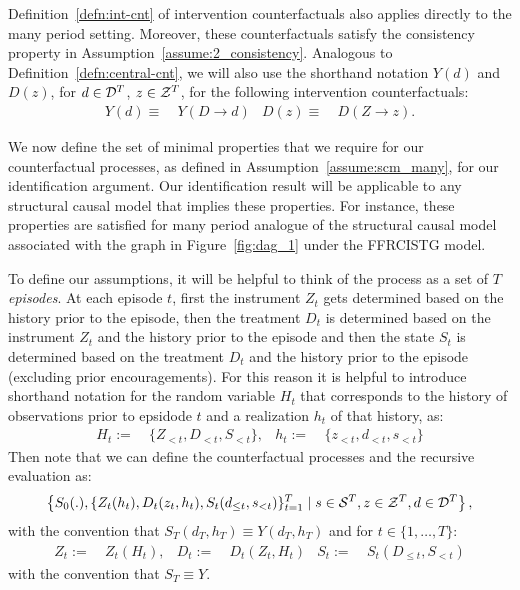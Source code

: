 Definition~\ref{defn:int-cnt} of intervention counterfactuals also applies directly to the many period setting. Moreover, these counterfactuals satisfy the consistency property in Assumption~\ref{assume:2_consistency}.
Analogous to Definition~\ref{defn:central-cnt}, we will also use the shorthand notation $Y(d)$ and $D(z)$, for $d\in {\cal D}^T$, $z\in {\cal Z}^T$, for the following intervention counterfactuals:
\begin{align}
Y(d)\equiv~& Y(D\to d) & 
D(z)\equiv~& D(Z\to z).
\end{align}

We now define the set of minimal properties that we require for our counterfactual processes, as defined in Assumption~\ref{assume:scm_many}, for our identification argument. Our identification result will be applicable to any structural causal model that implies these properties. For instance, these properties are satisfied for many period analogue of the structural causal model associated with the graph in Figure~\ref{fig:dag_1} under the FFRCISTG model. 

To define our assumptions, it will be helpful to think of the process as a set of $T$ \emph{episodes}. At each episode $t$, first the instrument $Z_t$ gets determined based on the history prior to the episode, then the treatment $D_t$ is determined based on the instrument $Z_t$ and the history prior to the episode and then the state $S_t$ is determined based on the treatment $D_t$ and the history prior to the episode (excluding prior encouragements). For this reason it is helpful to introduce shorthand notation for the random variable $H_t$ that corresponds to the history of observations prior to epsidode $t$ and a realization $h_t$ of that history, as:
\begin{align}
    H_t :=~& \{Z_{<t}, D_{<t}, S_{<t}\}, & h_t :=~& \{z_{<t}, d_{<t}, s_{<t}\}
\end{align}
Then note that we can define the counterfactual processes and the recursive evaluation as:
\begin{align}
    \left\{S_0(.), \{Z_{t}(h_{t}), D_{t}(z_t, h_{t}), S_{t}(d_{\leq t}, s_{< t})\}_{t=1}^T\mid s\in {\cal S}^T, z\in {\cal Z}^T, d\in {\cal D}^T\right\},
\end{align}
with the convention that $S_{T}(d_T, h_T)\equiv Y(d_T, h_T)$ and for $t\in \{1,\ldots, T\}$:
\begin{align}
    Z_t :=~& Z_t(H_t), & D_t :=~& D_t(Z_t, H_t) & S_t :=~& S_t(D_{\leq t}, S_{<t})
\end{align}
with the convention that $S_T\equiv Y$.

